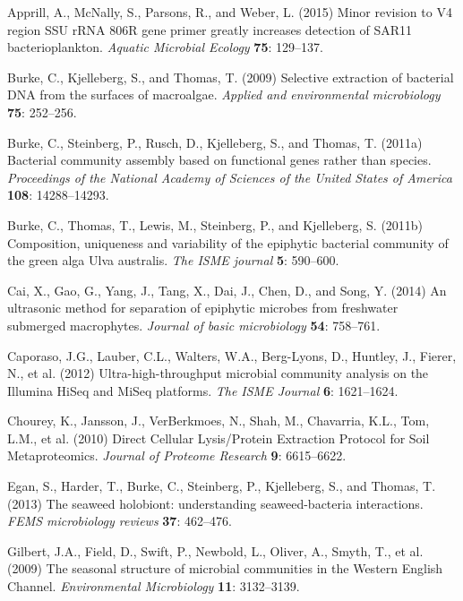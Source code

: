 \documentclass[12pt,]{article}
\begin{document}
\hypertarget{ref-Apprill2015}{}
Apprill, A., McNally, S., Parsons, R., and Weber, L. (2015) Minor
revision to V4 region SSU rRNA 806R gene primer greatly increases
detection of SAR11 bacterioplankton. \emph{Aquatic Microbial Ecology}
\textbf{75}: 129--137.

\hypertarget{ref-Burke2009}{}
Burke, C., Kjelleberg, S., and Thomas, T. (2009) Selective extraction of
bacterial DNA from the surfaces of macroalgae. \emph{Applied and
environmental microbiology} \textbf{75}: 252--256.

\hypertarget{ref-Burke2011a}{}
Burke, C., Steinberg, P., Rusch, D., Kjelleberg, S., and Thomas, T.
(2011a) Bacterial community assembly based on functional genes rather
than species. \emph{Proceedings of the National Academy of Sciences of
the United States of America} \textbf{108}: 14288--14293.

\hypertarget{ref-Burke2011b}{}
Burke, C., Thomas, T., Lewis, M., Steinberg, P., and Kjelleberg, S.
(2011b) Composition, uniqueness and variability of the epiphytic
bacterial community of the green alga Ulva australis. \emph{The ISME
journal} \textbf{5}: 590--600.

\hypertarget{ref-Cai2014}{}
Cai, X., Gao, G., Yang, J., Tang, X., Dai, J., Chen, D., and Song, Y.
(2014) An ultrasonic method for separation of epiphytic microbes from
freshwater submerged macrophytes. \emph{Journal of basic microbiology}
\textbf{54}: 758--761.

\hypertarget{ref-Caporaso2012}{}
Caporaso, J.G., Lauber, C.L., Walters, W.A., Berg-Lyons, D., Huntley,
J., Fierer, N., et al. (2012) Ultra-high-throughput microbial community
analysis on the Illumina HiSeq and MiSeq platforms. \emph{The ISME
Journal} \textbf{6}: 1621--1624.

\hypertarget{ref-Chourey2010}{}
Chourey, K., Jansson, J., VerBerkmoes, N., Shah, M., Chavarria, K.L.,
Tom, L.M., et al. (2010) Direct Cellular Lysis/Protein Extraction
Protocol for Soil Metaproteomics. \emph{Journal of Proteome Research}
\textbf{9}: 6615--6622.

\hypertarget{ref-Egan2013}{}
Egan, S., Harder, T., Burke, C., Steinberg, P., Kjelleberg, S., and
Thomas, T. (2013) The seaweed holobiont: understanding seaweed-bacteria
interactions. \emph{FEMS microbiology reviews} \textbf{37}: 462--476.

\hypertarget{ref-Gilbert2009}{}
Gilbert, J.A., Field, D., Swift, P., Newbold, L., Oliver, A., Smyth, T.,
et al. (2009) The seasonal structure of microbial communities in the
Western English Channel. \emph{Environmental Microbiology} \textbf{11}:
3132--3139.
\end{document}
